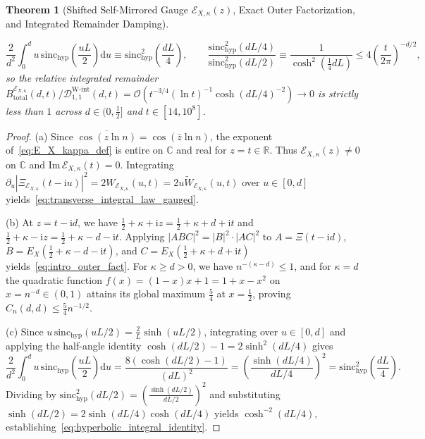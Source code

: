\documentclass[11pt,reqno]{amsart}
\newtheorem{theorem}{Theorem}[section]
\theoremstyle{definition}
\theoremstyle{remark}
\numberwithin{equation}{section}
\newcommand{\R}{\mathbb{R}}
\newcommand{\C}{\mathbb{C}}
\newcommand{\dd}{\mathrm{d}}
\newcommand{\ii}{\mathrm{i}}
\newcommand{\Ima}{\mathrm{Im}}
\newcommand{\sinch}{\mathrm{sinc}_{\mathrm{hyp}}}
\begin{document}
\begin{theorem}[Shifted Self-Mirrored Gauge $\mathcal{E}_{X,\kappa}(z)$, Exact Outer Factorization, and Integrated Remainder Damping]
\begin{enumerate}[label=\textup{(\alph*)},leftmargin=2.2em]
\begin{equation}\label{eq:hyperbolic_integral_identity}
\frac{2}{d^2}\int_0^d u\,\sinch\!\left(\frac{uL}{2}\right)\dd u \equiv \sinch^2\!\left(\frac{dL}{4}\right), \qquad \frac{\sinch^2(dL/4)}{\sinch^2(dL/2)} \equiv \frac{1}{\cosh^2\!\left(\frac{1}{4}dL\right)} \le 4\left(\frac{t}{2\pi}\right)^{-d/2},
\end{equation}
so the relative integrated remainder $B_{\mathrm{total}}^{\mathcal{E}_{X,\kappa}}(d,t)/\allowbreak\mathcal{D}_{1,1}^{\mathrm{W\text{-}int}}(d,t) =\allowbreak \mathcal{O}(t^{-3/4}(\ln t)^{-1}\allowbreak\cosh(dL/4)^{-2}) \to 0$ is strictly less than $1$ across $d \in (0, \frac{1}{2}]$ and $t \in [14, 10^8]$.
\end{enumerate}
\end{theorem}

\begin{proof}
(a) Since $\overline{\cos(z\ln n)} = \cos(\bar{z}\ln n)$, the exponent of~\eqref{eq:E_X_kappa_def} is entire on $\C$ and real for $z = t \in \R$. Thus $\mathcal{E}_{X,\kappa}(z) \neq 0$ on $\C$ and $\Ima\,\mathcal{E}_{X,\kappa}(t) = 0$. Integrating $\partial_u|\Xi_{\mathcal{E}_{X,\kappa}}(t-\ii u)|^2 = 2W_{\mathcal{E}_{X,\kappa}}(u,t) = 2u\widetilde{W}_{\mathcal{E}_{X,\kappa}}(u,t)$ over $u \in [0,d]$ yields~\eqref{eq:transverse_integral_law_gauged}.

(b) At $z = t - \ii d$, we have $\frac{1}{2} + \kappa + \ii z = \frac{1}{2} + \kappa + d + \ii t$ and $\frac{1}{2} + \kappa - \ii z = \frac{1}{2} + \kappa - d - \ii t$. Applying $|ABC|^2 = |B|^2\cdot|AC|^2$ to $A = \Xi(t-\ii d)$, $B = E_X(\frac{1}{2}+\kappa-d-\ii t)$, and $C = E_X(\frac{1}{2}+\kappa+d+\ii t)$ yields~\eqref{eq:intro_outer_fact}. For $\kappa \ge d > 0$, we have $n^{-(\kappa-d)} \le 1$, and for $\kappa = d$ the quadratic function $f(x) = (1-x)x + 1 = 1 + x - x^2$ on $x = n^{-d} \in (0,1)$ attains its global maximum $\frac{5}{4}$ at $x = \frac{1}{2}$, proving $C_n(d,d) \le \frac{5}{4}n^{-1/2}$.

(c) Since $u\,\sinch(uL/2) = \frac{2}{L}\sinh(uL/2)$, integrating over $u \in [0,d]$ and applying the half-angle identity $\cosh(dL/2) - 1 = 2\sinh^2(dL/4)$ gives
\[
\frac{2}{d^2}\int_0^d u\,\sinch\!\left(\frac{uL}{2}\right)\dd u = \frac{8(\cosh(dL/2) - 1)}{(dL)^2} = \left(\frac{\sinh(dL/4)}{dL/4}\right)^{\!2} = \sinch^2\!\left(\frac{dL}{4}\right).
\]
Dividing by $\sinch^2(dL/2) = (\frac{\sinh(dL/2)}{dL/2})^2$ and substituting $\sinh(dL/2) = 2\sinh(dL/4)\cosh(dL/4)$ yields $\cosh^{-2}(dL/4)$, establishing~\eqref{eq:hyperbolic_integral_identity}.
\end{proof}
\end{document}
